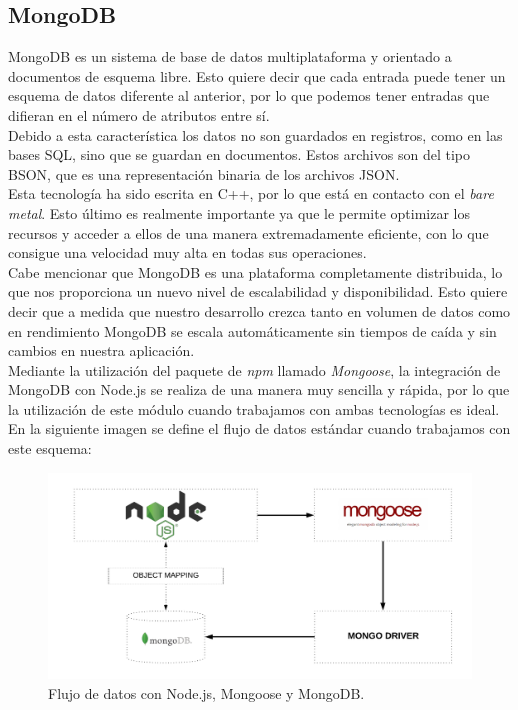 \subsection{MongoDB}

MongoDB es un sistema de base de datos multiplataforma y orientado a documentos de esquema libre.
Esto quiere decir que cada entrada puede tener un esquema de datos diferente al anterior, por
lo que podemos tener entradas que difieran en el número de atributos entre sí.\\

Debido a esta característica los datos no son guardados en registros, como en las bases SQL, 
sino que se guardan en documentos. Estos archivos son del tipo BSON, que es una representación
binaria de los archivos JSON.\\

Esta tecnología ha sido escrita en C++, por lo que está en contacto con el \textit{bare metal}. Esto
último es realmente importante ya que le permite optimizar los recursos y acceder a ellos de una 
manera extremadamente eficiente, con lo que consigue una velocidad muy alta en todas sus operaciones.\\

Cabe mencionar que MongoDB es una plataforma completamente distribuida, lo que nos proporciona 
un nuevo nivel de escalabilidad y disponibilidad. Esto quiere decir que a medida que nuestro desarrollo
crezca tanto en volumen de datos como en rendimiento MongoDB se escala automáticamente sin tiempos
de caída y sin cambios en nuestra aplicación.\\

Mediante la utilización del paquete de \textit{npm} llamado \textit{Mongoose}\cite{mongoose}, la integración de MongoDB
con Node.js se realiza de una manera muy sencilla y rápida, por lo que la utilización de este módulo
cuando trabajamos con ambas tecnologías es ideal. En la siguiente imagen se define el flujo de datos
estándar cuando trabajamos con este esquema:

\begin{figure}[H]
	\centering
	\includegraphics[scale=0.28]{imagenes/node-mongo.png}
	\caption{Flujo de datos con Node.js, Mongoose y MongoDB.\cite{image-mongoose} \label{fig:figura5}}
\end{figure}


